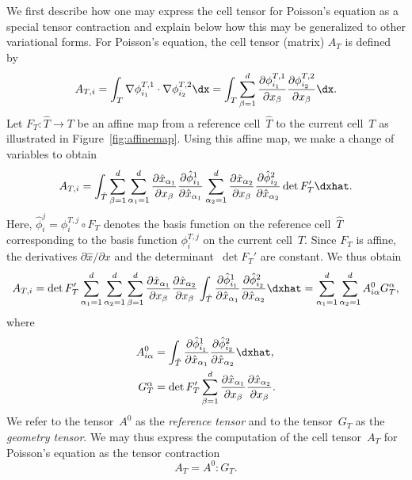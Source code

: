 We first describe how one may express the cell tensor for Poisson's
equation as a special tensor contraction and explain below how this
may be generalized to other variational forms. For Poisson's equation,
the cell tensor (matrix) $A_T$ is defined by
\begin{equation}
  A_{T,i} =
  \int_T
  \nabla \phi_{i_1}^{T,1} \cdot
  \nabla \phi_{i_2}^{T,2} \dx
  =
  \int_T
  \sum_{\beta=1}^d
  \frac{\partial \phi_{i_1}^{T,1}}{\partial x_{\beta}}
  \frac{\partial \phi_{i_2}^{T,2}}{\partial x_{\beta}} \dx.
\end{equation}
Let $F_T : \hat{T} \rightarrow T$ be an affine map from a
reference cell~$\hat{T}$ to the current cell~$T$ as illustrated in
Figure~\ref{fig:affinemap}. Using this affine map, we make a change of
variables to obtain
\begin{equation}
  A_{T,i} =
  \int_{\hat{T}}
  \sum_{\beta=1}^d
  \sum_{\alpha_1=1}^d
  \frac{\partial \hat{x}_{\alpha_1}}{\partial x_{\beta}}
  \frac{\partial \hat{\phi}^1_{i_1}}{\partial \hat{x}_{\alpha_1}}
  \sum_{\alpha_2=1}^d
  \frac{\partial \hat{x}_{\alpha_2}}{\partial x_{\beta}}
  \frac{\partial \hat{\phi}^2_{i_2}}{\partial \hat{x}_{\alpha_2}}
  \det F_T'
  \dxhat.
\end{equation}
Here, $\hat{\phi}_i^j = \phi_i^{T,j} \circ F_T$ denotes the basis function
on the reference cell~$\hat{T}$ corresponding to the basis function
$\phi_i^{T,j}$ on the current cell~$T$. Since $F_T$ is affine, the
derivatives $\partial \hat{x} / \partial x$ and the determinant~$\det F_T'$
are constant. We thus obtain
\begin{equation}
  A_{T,i} =
  \det F_T'
  \sum_{\alpha_1=1}^d
  \sum_{\alpha_2=1}^d
  \sum_{\beta=1}^d
  \frac{\partial \hat{x}_{\alpha_1}}{\partial x_{\beta}}
  \frac{\partial \hat{x}_{\alpha_2}}{\partial x_{\beta}}
  \int_{\hat{T}}
  \frac{\partial \hat{\phi}^1_{i_1}}{\partial \hat{x}_{\alpha_1}}
  \frac{\partial \hat{\phi}^2_{i_2}}{\partial \hat{x}_{\alpha_2}}
  \dxhat
  =
  \sum_{\alpha_1=1}^d
  \sum_{\alpha_2=1}^d
  A^0_{i\alpha} G_T^{\alpha},
\end{equation}
where
\begin{equation} \label{eq:poisson,AandG}
  \begin{split}
    A^0_{i\alpha}
    &=
    \int_{\hat{T}}
    \frac{\partial \hat{\phi}^1_{i_1}}{\partial \hat{x}_{\alpha_1}}
    \frac{\partial \hat{\phi}^2_{i_2}}{\partial \hat{x}_{\alpha_2}}
    \dxhat, \\
    G_T^{\alpha}
    &=
    \det F_T'
    \sum_{\beta=1}^d
    \frac{\partial \hat{x}_{\alpha_1}}{\partial x_{\beta}}
    \frac{\partial \hat{x}_{\alpha_2}}{\partial x_{\beta}}.
  \end{split}
\end{equation}
We refer to the tensor~$A^0$ as the \emph{reference tensor} and to the
tensor~$G_T$ as the \emph{geometry tensor}. We may thus express the
computation of the cell tensor~$A_T$ for Poisson's equation as the
tensor contraction
\begin{equation}
  A_T = A^0 : G_T.
\end{equation}

